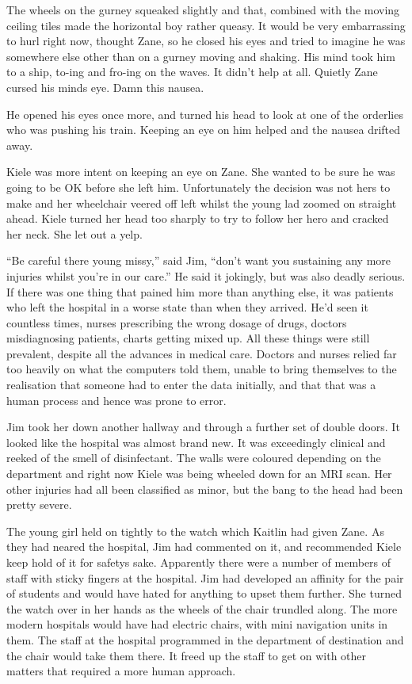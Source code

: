 The wheels on the gurney squeaked slightly and that, combined with the moving ceiling tiles made the horizontal boy rather queasy.  It would be very embarrassing to hurl right now, thought Zane, so he closed his eyes and tried to imagine he was somewhere else other than on a gurney moving and shaking.  His mind took him to a ship, to-ing and fro-ing on the waves.  It didn't help at all.  Quietly Zane cursed his minds eye.  Damn this nausea.  

He opened his eyes once more, and turned his head to look at one of the orderlies who was pushing his train.  Keeping an eye on him helped and the nausea drifted away.  

Kiele was more intent on keeping an eye on Zane.  She wanted to be sure he was going to be OK before she left him.  Unfortunately the decision was not hers to make and her wheelchair veered off left whilst the young lad zoomed on straight ahead.  Kiele turned her head too sharply to try to follow her hero and cracked her neck.  She let out a yelp.

``Be careful there young missy,'' said Jim, ``don't want you sustaining any more injuries whilst you're in our care.''  He said it jokingly, but was also deadly serious.  If there was one thing that pained him more than anything else, it was patients who left the hospital in a worse state than when they arrived.  He'd seen it countless times, nurses prescribing the wrong dosage of drugs, doctors misdiagnosing patients, charts getting mixed up.  All these things were still prevalent, despite all the advances in medical care.  Doctors and nurses relied far too heavily on what the computers told them, unable to bring themselves to the realisation that someone had to enter the data initially, and that that was a human process and hence was prone to error.

Jim took her down another hallway and through a further set of double doors.  It looked like the hospital was almost brand new.  It was exceedingly clinical and reeked of the smell of disinfectant.  The walls were coloured depending on the department and right now Kiele was being wheeled down for an MRI scan.  Her other injuries had all been classified as minor, but the bang to the head had been pretty severe.  

The young girl held on tightly to the watch which Kaitlin had given Zane.  As they had neared the hospital, Jim had commented on it, and recommended Kiele keep hold of it for safetys sake.  Apparently there were a number of members of staff with sticky fingers at the hospital.  Jim had developed an affinity for the pair of students and would have hated for anything to upset them further.  She turned the watch over in her hands as the wheels of the chair trundled along.  The more modern hospitals would have had electric chairs, with mini navigation units in them.  The staff at the hospital programmed in the department of destination and the chair would take them there.  It freed up the staff to get on with other matters that required a more human approach.

